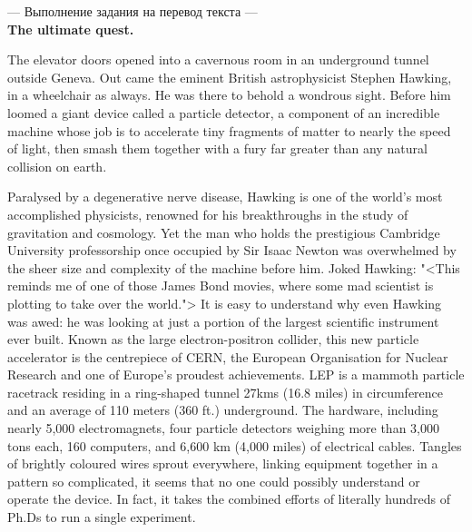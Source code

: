 \documentclass[main.tex]{subfiles}
\begin{document}


--- Выполнение задания на перевод текста ---
\\

\textbf{The ultimate quest.}

The elevator doors opened into a cavernous room in an underground tunnel outside Geneva.
Out came the eminent British astrophysicist Stephen Hawking, in a wheelchair as always.
He was there to behold a wondrous sight.
Before him loomed a giant device called a particle detector, a component of an incredible machine whose job is to accelerate tiny fragments of matter to nearly the speed of light, then smash them together with a fury far greater than any natural collision on earth.

Paralysed by a degenerative nerve disease, Hawking is one of the world's most accomplished physicists, renowned for his breakthroughs in the study of gravitation and cosmology.
Yet the man who holds the prestigious Cambridge University professorship once occupied by Sir Isaac Newton was overwhelmed by the sheer size and complexity of the machine before him.
Joked Hawking: "<This reminds me of one of those James Bond movies, where some mad scientist is plotting to take over the world.">
It is easy to understand why even Hawking was awed: he was looking at just a portion of the largest scientific instrument ever built.
Known as the large electron-positron collider, this new particle accelerator is the centrepiece of CERN, the European Organisation for Nuclear Research and one of Europe's proudest achievements.
LEP is a mammoth particle racetrack residing in a ring-shaped tunnel 27kms (16.8 miles) in circumference and an average of 110 meters (360 ft.) underground.
The hardware, including nearly 5,000 electromagnets, four particle detectors weighing more than 3,000 tons each, 160 computers, and 6,600 km (4,000 miles) of electrical cables.
Tangles of brightly coloured wires sprout everywhere, linking equipment together in a pattern so complicated, it seems that no one could possibly understand or operate the device.
In fact, it takes the combined efforts of literally hundreds of Ph.Ds to run a single experiment.
\\

\end{document}

